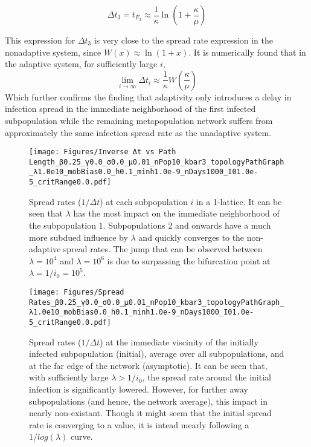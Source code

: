 \begin{equation}\Delta t_3 = t_{F_3} \approx \frac{1}{\kappa} \ln(1+\frac{ \kappa}{\mu})\end{equation}

This expression for $\Delta t_3$ is very close to the spread rate expression in the nonadaptive system, since $W(x) \approx \ln(1+x)$. It is numerically found that in the adaptive system, for sufficiently large $i$, 
\[
\lim_{i \to \infty} \Delta t_i \approx \frac{1}{\kappa} W\left(\frac{\kappa}{\mu}\right)
\]
Which further confirms the finding that adaptivity only introduces a delay in infection spread in the immediate neighborhood of the first infected subpopulation while the remaining metapopulation network suffers from approximately the same infection spread rate as the unadaptive system. 


\begin{figure}
    \centering
    \texttt{[image: Figures/Inverse Δt vs Path Length\_β0.25\_γ0.0\_σ0.0\_μ0.01\_nPop10\_kbar3\_topologyPathGraph\_λ1.0e10\_mobBias0.0\_h0.1\_minh1.0e-9\_nDays1000\_I01.0e-5\_critRange0.0.pdf]}
    \caption{\small Spread rates ($1/\Delta t$) at each subpopulation $i$ in a 1-lattice. It can be seen that $\lambda$ has the most impact on the immediate neighborhood of the subpopulation 1. Subpopulations 2 and onwards have a much more subdued influence by $\lambda$ and quickly converges to the non-adaptive spread rates. The jump that can be observed between $\lambda=10^4$ and $\lambda=10^6$ is due to surpassing the bifurcation point at $\lambda=1/i_0=10^5$. }
    \label{fig: inverse Δt vs path length var lambda}
\end{figure}

\begin{figure}
    \centering
    \texttt{[image: Figures/Spread Rates\_β0.25\_γ0.0\_σ0.0\_μ0.01\_nPop10\_kbar3\_topologyPathGraph\_λ1.0e10\_mobBias0.0\_h0.1\_minh1.0e-9\_nDays1000\_I01.0e-5\_critRange0.0.pdf]}
    \caption{\small Spread rates ($1/{\Delta t}$) at the immediate viscinity of the initially infected subpopulation (initial), average over all subpopulations, and at the far edge of the network (asymptotic). It can be seen that, with sufficiently large $\lambda >1/i_0$, the spread rate around the initial infection is significantly lowered. However, for further away subpopulations (and hence, the network average), this impact in nearly non-existant. Though it might seem that the initial spread rate is converging to a value, it is intead mearly following a $1/log(\lambda)$ curve.}
    \label{fig: Spread rates vs λ}
\end{figure}


